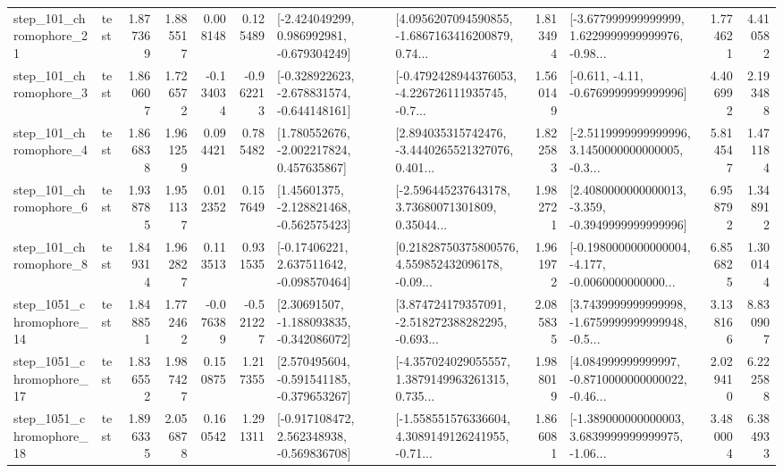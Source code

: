 \begin{tabular}{llrrrrllrlrr}
  step\_101\_chromophore\_21 &      test &      1.877369 &    1.885517 &      0.008148 &  0.125489 &   [-2.424049299, 0.986992981, -0.679304249] &  [4.0956207094590855, -1.6867163416200879, 0.74... &       1.813494 &  [-3.677999999999999, 1.6229999999999976, -0.98... &            1.774621 &          4.410582 \\
   step\_101\_chromophore\_3 &      test &      1.860607 &    1.726572 &     -0.134034 & -0.962213 &  [-0.328922623, -2.678831574, -0.644148161] &  [-0.4792428944376053, -4.226726111935745, -0.7... &       1.560149 &               [-0.611, -4.11, -0.6769999999999996] &            4.406992 &          2.193488 \\
   step\_101\_chromophore\_4 &      test &      1.866838 &    1.961259 &      0.094421 &  0.785482 &    [1.780552676, -2.002217824, 0.457635867] &  [2.894035315742476, -3.4440265521327076, 0.401... &       1.822583 &  [-2.5119999999999996, 3.1450000000000005, -0.3... &            5.814547 &          1.471184 \\
   step\_101\_chromophore\_6 &      test &      1.938785 &    1.951137 &      0.012352 &  0.157649 &    [1.45601375, -2.128821468, -0.562575423] &  [-2.596445237643178, 3.73680071301809, 0.35044... &       1.982721 &  [2.4080000000000013, -3.359, -0.3949999999999996] &            6.958792 &          1.348912 \\
   step\_101\_chromophore\_8 &      test &      1.849314 &    1.962827 &      0.113513 &  0.931535 &    [-0.17406221, 2.637511642, -0.098570464] &  [0.21828750375800576, 4.559852432096178, -0.09... &       1.961972 &  [-0.1980000000000004, -4.177, -0.0060000000000... &            6.856825 &          1.300144 \\
 step\_1051\_chromophore\_14 &      test &      1.848851 &    1.772462 &     -0.076389 & -0.521227 &    [2.30691507, -1.188093835, -0.342086072] &  [3.874724179357091, -2.518272388282295, -0.693... &       2.085835 &  [3.7439999999999998, -1.6759999999999948, -0.5... &            3.138166 &          8.830907 \\
 step\_1051\_chromophore\_17 &      test &      1.836552 &    1.987427 &      0.150875 &  1.217355 &   [2.570495604, -0.591541185, -0.379653267] &  [-4.357024029055557, 1.3879149963261315, 0.735... &       1.988019 &  [4.084999999999997, -0.8710000000000022, -0.46... &            2.029410 &          6.222588 \\
 step\_1051\_chromophore\_18 &      test &      1.896335 &    2.056878 &      0.160542 &  1.291311 &   [-0.917108472, 2.562348938, -0.569836708] &  [-1.558551576336604, 4.3089149126241955, -0.71... &       1.866081 &  [-1.389000000000003, 3.6839999999999975, -1.06... &            3.480004 &          6.384933 \\

\end{tabular}

